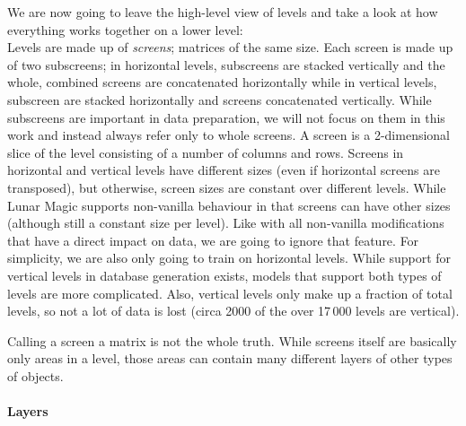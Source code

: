 We are now going to leave the high-level view of levels and take a
look at how everything works together on a lower level: \\
Levels are made up of \emph{screens}; matrices of the same size. Each
screen is made up of two subscreens; in horizontal levels, subscreens
are stacked vertically and the whole, combined screens are
concatenated horizontally while in vertical levels, subscreen are
stacked horizontally and screens concatenated vertically. While
subscreens are important in data preparation, we will not focus on
them in this work and instead always refer only to whole screens. A
screen is a 2-dimensional slice of the level consisting of a number of
columns and rows. Screens in horizontal and vertical levels have
different sizes (even if horizontal screens are transposed), but
otherwise, screen sizes are constant over different levels. While
Lunar Magic supports non-vanilla behaviour in that screens can have
other sizes (although still a constant size per level). Like with all
non-vanilla modifications that have a direct impact on data, we are
going to ignore that feature. For simplicity, we are also only going
to train on horizontal levels. While support for vertical levels in
database generation exists, models that support both types of levels
are more complicated. Also, vertical levels only make up a fraction of
total levels, so not a lot of data is lost (circa 2000 of the over
17\,000 levels are vertical).

Calling a screen a matrix is not the whole truth. While screens itself
are basically only areas in a level, those areas can contain many
different layers of other types of objects.

\paragraph{Layers}
\label{par:layers}

